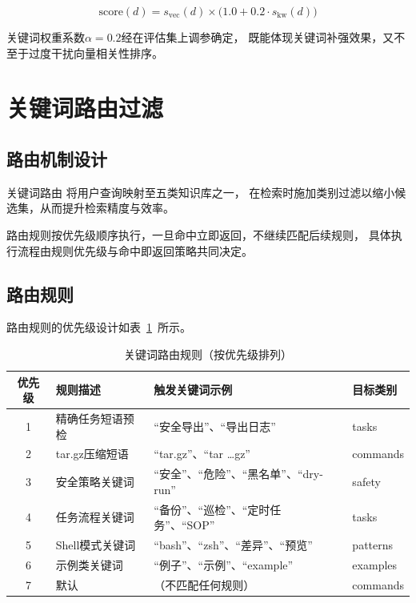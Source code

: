 \begin{equation}
\text{score}(d) = s_\text{vec}(d) \times \bigl(1.0 + 0.2 \cdot s_\text{kw}(d)\bigr)
\end{equation}

关键词权重系数$\alpha = 0.2$经在评估集上调参确定，
既能体现关键词补强效果，又不至于过度干扰向量相关性排序。

\section{关键词路由过滤}

\subsection{路由机制设计}

关键词路由
将用户查询映射至五类知识库之一，
在检索时施加类别过滤以缩小候选集，从而提升检索精度与效率。

路由规则按优先级顺序执行，一旦命中立即返回，不继续匹配后续规则，
具体执行流程由规则优先级与命中即返回策略共同决定。

\subsection{路由规则}

路由规则的优先级设计如表~\ref{tab:routing-rules}~所示。

\begin{table}[htbp]
\centering
\caption{关键词路由规则（按优先级排列）}
\label{tab:routing-rules}
\begin{tabular}{clll}
\toprule
优先级 & 规则描述 & 触发关键词示例 & 目标类别 \\
\midrule
1 & 精确任务短语预检 & “安全导出”、“导出日志” & tasks \\
2 & tar.gz压缩短语 & “tar.gz”、“tar …gz” & commands \\
3 & 安全策略关键词 & “安全”、“危险”、“黑名单”、“dry-run” & safety \\
4 & 任务流程关键词 & “备份”、“巡检”、“定时任务”、“SOP” & tasks \\
5 & Shell模式关键词 & “bash”、“zsh”、“差异”、“预览” & patterns \\
6 & 示例类关键词 & “例子”、“示例”、“example” & examples \\
7 & 默认 & （不匹配任何规则） & commands \\
\bottomrule
\end{tabular}
\end{table}

